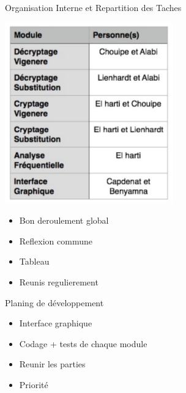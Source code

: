 \documentclass[10pt,xcolor=table]{beamer}
\begin{document}
\begin{frame}
	\begin{block}{Organisation Interne et Repartition des Taches}
	\begin{center}
		\includegraphics[scale =0.45]{taches.png} \\ 
	\end{center}
		\begin{itemize}
		\item Bon deroulement global\\ 
		\item Reflexion commune\\ 
		\item Tableau\\ 
		\item Reunis regulierement\\ 
	\end{itemize}
	\end{block}
\end{frame}
\begin{frame}
	\begin{block}{Planing de développement}
			\begin{itemize}
		\item Interface graphique\\ 
		\item Codage + tests de chaque module\\ 
		\item Reunir les parties\\ 
		\item Priorité\\ 
	\end{itemize}
	\end{block}
\end{frame}
\end{document}
